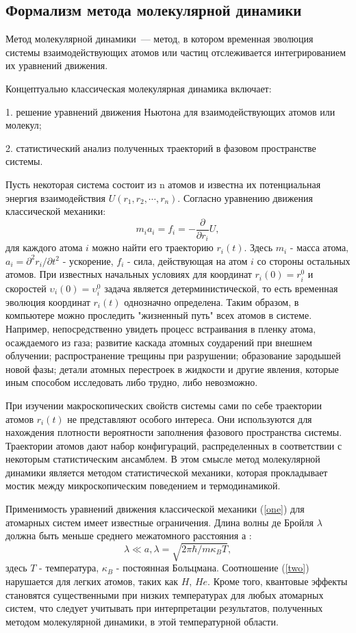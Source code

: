 \subsection{Формализм метода молекулярной динамики}
\label{sec:1b}

Метод молекулярной динамики~--- метод, в котором временная эволюция системы
взаимодействующих атомов или частиц отслеживается интегрированием их уравнений
движения.

Концептуально классическая молекулярная динамика включает:

1. решение уравнений движения Ньютона для взаимодействующих атомов или молекул;

2. статистический анализ полученных траекторий в фазовом пространстве системы.

Пусть некоторая система состоит из n атомов и известна их потенциальная энергия
взаимодействия $U(r_1, r_2, \cdots , r_n).$
Согласно уравнению движения классической механики:
\begin{equation}
\label{one}
m_{i}a_{i}=f_i=-\frac{\partial}{\partial r_i}U,
\end{equation}
для каждого атома $i$ можно найти его траекторию $r_i(t)$. Здесь $m_i$ - масса
атома, $a_i=\partial^2r_i/\partial t^2$ - ускорение,
$f_i$ - сила, действующая на атом $i$ со стороны остальных атомов. При
известных начальных условиях для координат $r_i(0)=r_i^0$ и
скоростей $\upsilon_i(0)=\upsilon_i^0$  задача является
детерминистической, то есть временная эволюция координат $r_i(t)$
однозначно определена. Таким образом, в компьютере можно проследить "жизненный
путь" всех атомов в системе. Например, непосредственно увидеть процесс
встраивания в пленку атома, осаждаемого из газа; развитие каскада атомных
соударений при внешнем облучении; распространение трещины при разрушении;
образование зародышей новой фазы; детали атомных перестроек в жидкости и другие
явления, которые иным способом исследовать либо трудно, либо невозможно.

При изучении макроскопических свойств системы сами по себе траектории атомов
$r_i(t)$ не представляют особого интереса. Они используются для
нахождения плотности вероятности заполнения фазового пространства системы.
Траектории атомов дают набор конфигураций, распределенных в соответствии с
некоторым статистическим ансамблем. В этом смысле метод молекулярной динамики является
методом статистической механики, которая прокладывает мостик между микроскопическим
поведением и термодинамикой.

Применимость уравнений движения классической механики (\ref{one}) для атомарных
систем имеет известные ограничения. Длина волны де Бройля $\lambda$ должна быть
меньше среднего межатомного расстояния а :
\begin{equation}
\label{two}
\lambda \ll a, \lambda=\sqrt{2\pi\hbar/m\kappa_B T},
\end{equation}
здесь $T$ - температура, $\kappa_B$ - постоянная Больцмана. Соотношение
(\ref{two}) нарушается для легких атомов, таких как $H$, $He$. Кроме того,
квантовые эффекты становятся существенными при низких температурах для любых
атомарных систем, что следует учитывать при интерпретации результатов, полученных
методом молекулярной динамики, в этой температурной области.

